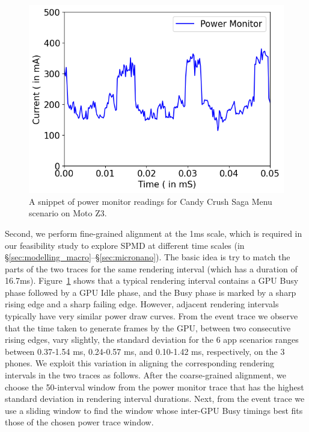 \begin{figure}[tp]
    \vspace{-0.1in}
    \centering
    \includegraphics[width=0.50\columnwidth]{figures/candy_crush_saga_menu_timeline.png}
    \vspace{-0.1in}
    \caption{A snippet of power monitor readings for Candy Crush Saga Menu scenario on Moto Z3.}
    \label{fig:power_trace_candycrush_menu}
    \vspace{-0.2in}
\end{figure}

Second, we perform fine-grained alignment at the 1ms scale, which is
required in our feasibility study to explore SPMD at different
time scales (in \S\ref{sec:modelling_macro}--\S\ref{sec:micronano}).
The basic idea is try to match the parts of the two traces
for the same rendering interval (which has a duration of 16.7ms).
Figure~\ref{fig:power_trace_candycrush_menu} shows that
a typical rendering interval contains a GPU Busy phase followed
by a GPU Idle phase, and the Busy phase is marked
by a sharp rising edge and a sharp failing edge.
However, adjacent rendering intervals
typically have very similar power draw curves.
From the event trace we observe that the time taken to generate frames
by the GPU, \ie between two consecutive rising edges,  vary slightly, \eg
the standard deviation 
for the 6 app scenarios ranges between 0.37-1.54 ms, 0.24-0.57 ms,
 and 0.10-1.42 ms,
respectively, on the 3 phones.
%
We exploit this variation in aligning the corresponding rendering intervals
in the two traces as follows.
After the coarse-grained alignment,
we choose the 50-interval window  from the power monitor trace that has
the highest standard deviation in rendering interval durations.
Next, from the event trace we use a sliding window to find the window
whose inter-GPU Busy timings best fits those of the chosen power trace window.

